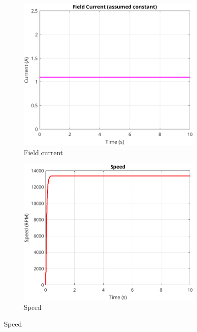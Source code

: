 \documentclass[a4paper,12pt]{article}
\begin{document}
\begin{figure}[h]
\begin{subfigure}{0.45\textwidth}
\includegraphics[width=\textwidth]{code/if.png}
\caption{Field current}
\end{subfigure}
\begin{subfigure}{0.45\textwidth}
\includegraphics[width=\textwidth]{code/Speed.png}
\caption{Speed}
\end{subfigure}
\end{figure}
\end{document}
